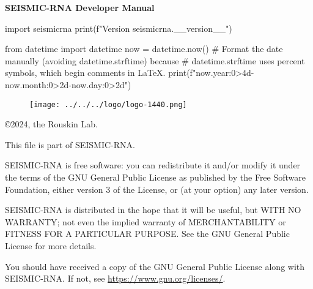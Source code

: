 \documentclass[main.tex]{subfiles}
\begin{document}
\begin{titlepage}


\begin{center}

\huge
\textbf{SEISMIC-RNA Developer Manual}
\normalsize

\vspace{0.5cm}

\Large
\begin{python}
import seismicrna
print(f"Version {seismicrna.__version__}")
\end{python}
\normalsize

\vspace{0.25cm}

\Large
\begin{python}
from datetime import datetime
now = datetime.now()
# Format the date manually (avoiding datetime.strftime) because
# datetime.strftime uses percent symbols, which begin comments in LaTeX.
print(f"{now.year:0>4d}-{now.month:0>2d}-{now.day:0>2d}")
\end{python}
\normalsize

\end{center}

\vspace{2cm}

\begin{figure}[h]
    \texttt{[image: ../../../logo/logo-1440.png]}
\end{figure}


\end{titlepage}


\pagebreak



\noindent
\copyright 2024, the Rouskin Lab.

\vspace{0.5cm}

\noindent
This file is part of SEISMIC-RNA.

\vspace{0.25cm}

\noindent
SEISMIC-RNA is free software: you can redistribute it and/or modify it
under the terms of the GNU General Public License as published by the
Free Software Foundation, either version 3 of the License, or (at your
option) any later version.

\vspace{0.25cm}

\noindent
SEISMIC-RNA is distributed in the hope that it will be useful, but WITH
NO WARRANTY; not even the implied warranty of MERCHANTABILITY or FITNESS
FOR A PARTICULAR PURPOSE. See the GNU General Public License for more
details.

\vspace{0.25cm}

\noindent
You should have received a copy of the GNU General Public License along
with SEISMIC-RNA. If not, see \url{https://www.gnu.org/licenses/}.


\pagebreak
\end{document}
